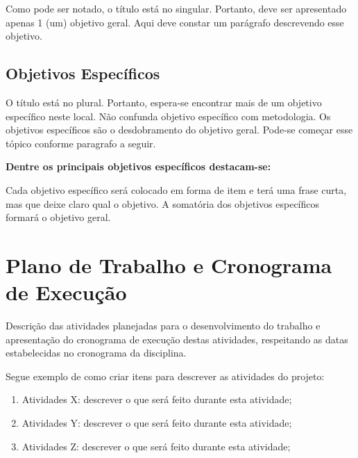 \documentclass[
    12pt,               %
    a4paper,            %
    english,            %
    brazil,             %
    ]{article}
\begin{document}
Como pode ser notado, o título está no singular. Portanto, deve ser apresentado apenas 1 (um) objetivo geral. Aqui deve constar um parágrafo descrevendo esse objetivo.

\subsection{Objetivos Específicos}

O título está no plural. Portanto, espera-se encontrar mais de um objetivo específico neste local. Não confunda objetivo específico com metodologia.
Os objetivos específicos são o desdobramento do objetivo geral. Pode-se começar esse tópico conforme paragrafo a seguir.

{\bf Dentre os principais objetivos específicos destacam-se: }

Cada objetivo específico será colocado em forma de item e terá uma frase curta, mas que deixe claro qual o objetivo.
A somatória dos objetivos específicos formará o objetivo geral.


\section{Plano de Trabalho e Cronograma de Execução}

    Descrição das atividades planejadas para o desenvolvimento do trabalho e apresentação do cronograma de
execução destas atividades, respeitando as datas estabelecidas no cronograma da disciplina.


    Segue exemplo de como criar itens para descrever as atividades do projeto:

    \begin{enumerate}

        \item Atividades X: descrever o que será feito durante esta atividade;   \label{a1}

        \item Atividades Y: descrever o que será feito durante esta atividade;   \label{a2}

        \item Atividades Z: descrever o que será feito durante esta atividade;   \label{a3}

    \end{enumerate}
\end{document}
